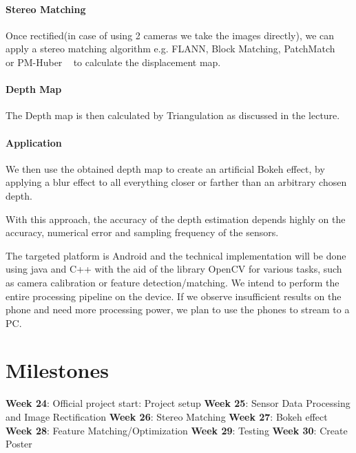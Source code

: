 \documentclass[a4paper,pagesize 10pt]{scrartcl}
\begin{document}
\paragraph{Stereo Matching}
Once rectified(in case of using 2 cameras we take the images directly), we can apply a stereo matching algorithm e.g. FLANN, Block Matching, PatchMatch ~\cite{Bleyer2011} or PM-Huber ~\cite{Heise2013} to calculate the displacement map. 
\paragraph{Depth Map}
The Depth map is then calculated by Triangulation as discussed in the lecture.
\paragraph{Application}
We then use the obtained depth map to create an artificial Bokeh effect, by applying a blur effect to all everything closer or farther than an arbitrary chosen depth.


With this approach, the accuracy of the depth estimation depends highly on the accuracy, numerical error and sampling frequency of the sensors.

The targeted platform is Android and the technical implementation will be done using java and C++ with the aid of the library OpenCV for various tasks, such as camera calibration or feature detection/matching. We intend to perform the entire processing pipeline on the device. If we observe insufficient results on the phone and need more processing power, we plan to use the phones to stream to a PC.

%
%
\section{Milestones}
\textbf{Week 24}: Official project start: Project setup\newline
\textbf{Week 25}: Sensor Data Processing and Image Rectification\newline
\textbf{Week 26}: Stereo Matching\newline
\textbf{Week 27}: Bokeh effect\newline
\textbf{Week 28}: Feature Matching/Optimization \newline
\textbf{Week 29}: Testing\newline
\textbf{Week 30}: Create Poster\newline
\end{document}
